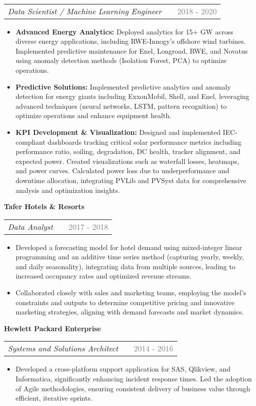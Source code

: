 \documentclass[a4paper,12pt]{article}
\makeatletter
\newenvironment{joblong}[3]
    {
    \noindent\textbf{\large #1}\\ %
    \begin{tabularx}{\linewidth}{@{}l X r@{}}
    \textit{#2} & &  {\textcolor{gray}{#3}} \\[3.75pt] %
    \end{tabularx}
    \begin{minipage}[t]{\linewidth}
    \begin{itemize}[nosep,after=\strut, leftmargin=1em, itemsep=3pt,label=--]
    }
    {
    \end{itemize}
    \end{minipage}    
    }
\makeatother
\begin{document}
\begin{joblong}{}{Data Scientist / Machine Learning Engineer}{2018 - 2020}
    \item \textbf{Advanced Energy Analytics:} Deployed analytics for 15+ GW across diverse energy applications, including RWE-Innogy's offshore wind turbines. Implemented predictive maintenance for Enel, Longroad, RWE, and Novatus using anomaly detection methods (Isolation Forest, PCA) to optimize operations.
    \item \textbf{Predictive Solutions:} Implemented predictive analytics and anomaly detection for energy giants including ExxonMobil, Shell, and Enel, leveraging advanced techniques (neural networks, LSTM, pattern recognition) to optimize operations and enhance equipment health.
    \item \textbf{KPI Development \& Visualization:} Designed and implemented IEC-compliant dashboards tracking critical solar performance metrics including performance ratio, soiling, degradation, DC health, tracker alignment, and expected power. Created visualizations such as waterfall losses, heatmaps, and power curves. Calculated power loss due to underperformance and downtime allocation, integrating PVLib and PVSyst data for comprehensive analysis and optimization insights.
\end{joblong}

\begin{joblong}{Tafer Hotels \&  Resorts }{Data Analyst}{2017 - 2018}
    \item Developed a forecasting model for hotel demand using mixed-integer linear programming and an additive time series method (capturing yearly, weekly, and daily seasonality), integrating data from multiple sources, leading to increased occupancy rates and optimized revenue streams.
    \item Collaborated closely with sales and marketing teams, employing the model's constraints and outputs to determine competitive pricing and innovative marketing strategies, aligning with demand forecasts and market dynamics.
\end{joblong}

\begin{joblong}{Hewlett Packard Enterprise}{Systems and Solutions Architect}{2014 - 2016}
    \item Developed a cross-platform support application for SAS, Qlikview, and Informatica, significantly enhancing incident response times. Led the adoption of Agile methodologies, ensuring consistent delivery of business value through efficient, iterative sprints.
\end{joblong}
    
\end{document}
